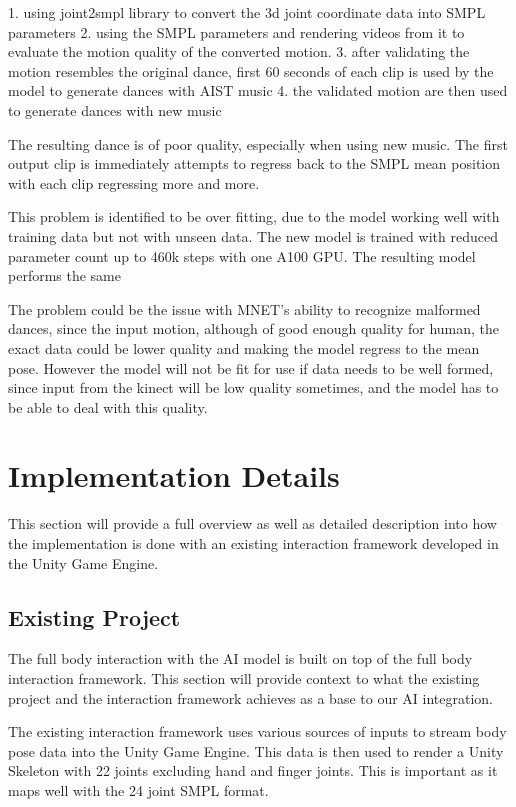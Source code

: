 \documentclass[final,5p,times,authoryear]{article}
\begin{document}
1. using joint2smpl library to convert the 3d joint coordinate data into SMPL
parameters
2. using the SMPL parameters and rendering videos from it to evaluate the motion
quality of the converted motion.
3. after validating the motion resembles the original dance, first 60 seconds of
each clip is used by the model to generate dances with AIST music
4. the validated motion are then used to generate dances with new music

The resulting dance is of poor quality, especially when using new music. The
first output clip is immediately attempts to regress back to the SMPL mean
position with each clip regressing more and more.

This problem is identified to be over fitting, due to the model working well with
training data but not with unseen data. The new model is trained with reduced
parameter count up to 460k steps with one A100 GPU. The resulting model performs
the same

The problem could be the issue with MNET's ability to recognize malformed
dances, since the input motion, although of good enough quality for human, the
exact data could be lower quality and making the model regress to the mean pose.
However the model will not be fit for use if data needs to be well formed, since
input from the kinect will be low quality sometimes, and the model has to be
able to deal with this quality.

\section{Implementation Details}
This section will provide a full overview as well as detailed description into how the implementation is done with an existing interaction framework developed in the Unity Game Engine.

\subsection{Existing Project}
The full body interaction with the AI model is built on top of the full body interaction framework. This section will provide context to what the existing project and the interaction framework achieves as a base to our AI integration.

The existing interaction framework uses various sources of inputs to stream body pose data into the Unity Game Engine. This data is then used to render a Unity Skeleton with 22 joints excluding hand and finger joints. This is important as it maps well with the 24 joint SMPL format.
\end{document}
